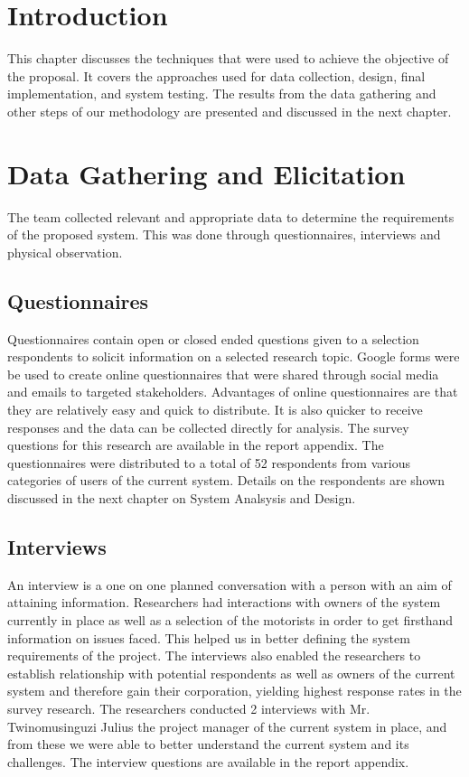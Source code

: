 \section{Introduction}
This chapter discusses the techniques that were used to achieve the objective of the proposal. It covers the approaches used for data collection, design, final implementation, and system testing. The results from the data gathering and other steps of our methodology are presented and discussed in the next chapter.


\section{Data Gathering and Elicitation}
The team collected relevant and appropriate data to determine the requirements of the proposed system. This was done through questionnaires, interviews and physical observation\cite{kothari_research_2004}.

\subsection{Questionnaires}
Questionnaires contain open or closed ended questions given to a selection respondents to solicit information on a selected research topic\cite{bartram_using_2019}. Google forms \cite{googleforms} were be used to create online questionnaires that were shared through social media and emails to targeted stakeholders. Advantages of online questionnaires are that they are relatively easy and quick to distribute. It is also quicker to receive responses and the data can be collected directly for analysis. The survey questions for this research are available in the report appendix. The questionnaires were distributed to a total of 52 respondents from various categories of users of the current system. Details on the respondents are shown discussed in the next chapter on System Analsysis and Design.

\subsection{Interviews}
An interview is a one on one planned conversation with a person with an aim of attaining information. Researchers had interactions with owners of the system currently in place as well as a selection of the motorists in order to get firsthand information on issues faced. This helped us in better defining the system requirements of the project. The interviews also enabled the researchers to establish relationship with potential respondents as well as owners of the current system and therefore gain their corporation,  yielding highest response rates in the survey research. The researchers conducted 2 interviews with Mr. Twinomusinguzi Julius the project manager of the current system in place, and from these we were able to better understand the current system and its challenges. The interview questions are available in the report appendix.

